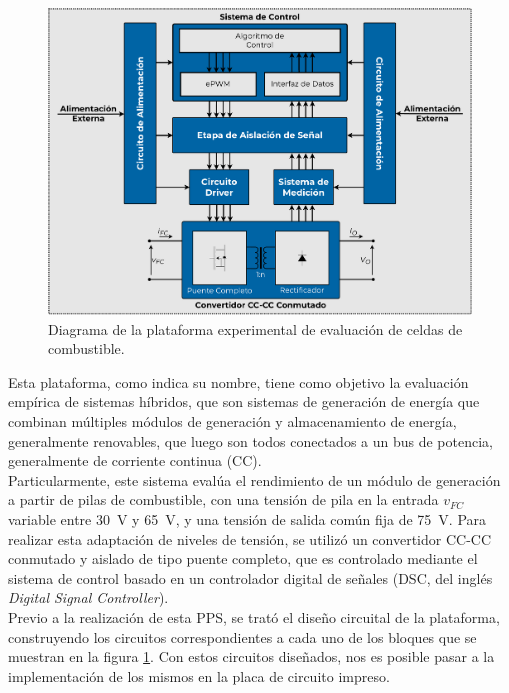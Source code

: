 \begin{figure}[h]
    \centering
    \includegraphics[scale=0.4]{Imagenes/Plataforma Detallada.pdf}
    \caption{Diagrama de la plataforma experimental de evaluación de celdas de combustible.}
    \label{fig:plataforma}
\end{figure}

Esta plataforma, como indica su nombre, tiene como objetivo la evaluación empírica de sistemas híbridos, que son sistemas de generación de energía que combinan múltiples módulos de generación y almacenamiento de energía, generalmente renovables, que luego son todos conectados a un bus de potencia, generalmente de corriente continua (CC).\\

Particularmente, este sistema evalúa el rendimiento de un módulo de generación a partir de pilas de combustible, con una tensión de pila en la entrada $v_{FC}$ variable entre \SI[]{30}[]{\volt} y \SI[]{65}[]{\volt}, y una tensión de salida común fija de \SI[]{75}[]{\volt}. Para realizar esta adaptación de niveles de tensión, se utilizó un convertidor CC-CC conmutado y aislado de tipo puente completo, que es controlado mediante el sistema de control basado en un controlador digital de señales (DSC, del inglés \textit{Digital Signal Controller}).\\

Previo a la realización de esta PPS, se trató el diseño circuital de la plataforma, construyendo los circuitos correspondientes a cada uno de los bloques que se muestran en la figura \ref{fig:plataforma}. Con estos circuitos diseñados, nos es posible pasar a la implementación de los mismos en la placa de circuito impreso.\\